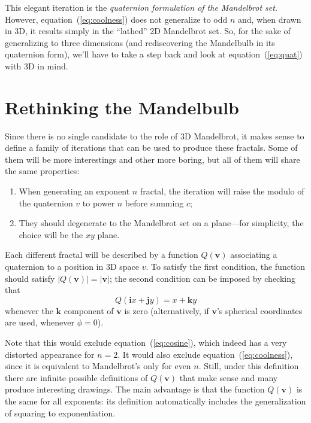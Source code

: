 \documentclass{article}
\let\vec\mathbf
\begin{document}
\noindent
This elegant iteration is the \emph{quaternion formulation of the
  Mandelbrot set}.  However, equation~(\ref{eq:coolness}) does not
generalize to odd $n$ and, when drawn in 3D, it results simply in the
``lathed'' 2D Mandelbrot set.  So, for the sake of generalizing to
three dimensions (and rediscovering the Mandelbulb in its quaternion
form), we'll have to take a step back and look at
equation~(\ref{eq:quat}) with 3D in mind.

\section{Rethinking the Mandelbulb}

Since there is no single candidate to the role of 3D Mandelbrot, it
makes sense to define a family of iterations that can be used to produce
these fractals.  Some of them will be more interestings and other more
boring, but all of them will share the same properties:
\begin{enumerate}
\item When generating an exponent $n$ fractal, the iteration will
  raise the modulo of the quaternion $v$ to power $n$ before summing
  $c$;

\item\label{item:mandel-xy} They should degenerate to the Mandelbrot
  set on a plane---for simplicity, the choice will be the $xy$ plane.
\end{enumerate}

Each different fractal will be described by a function $Q(\vec{v})$
associating a quaternion to a position in 3D space $v$.  To satisfy
the first condition, the function should satisfy $|Q(\vec{v})| =
|\vec{v}|$; the second condition can be imposed by checking that
\begin{equation*}
\label{eq:its-mandel}
 Q(\vec{i}x+\vec{j}y) = x+\vec{k}y
\end{equation*}
\noindent
whenever the $\vec{k}$ component of $\vec{v}$ is zero (alternatively,
if $\vec{v}$'s spherical coordinates are used, whenever $\phi = 0$).

Note that this would exclude equation~(\ref{eq:cosine}), which indeed
has a very distorted appearance for $n=2$.  It would also exclude
equation~(\ref{eq:coolness}), since it is equivalent to Mandelbrot's
only for even $n$.  Still, under this definition there are infinite
possible definitions of $Q(\vec{v})$ that make sense and many produce
interesting drawings.  The main advantage is that the function
$Q(\vec{v})$ is the same for all exponents: its definition
automatically includes the generalization of squaring to
exponentiation.
\end{document}
